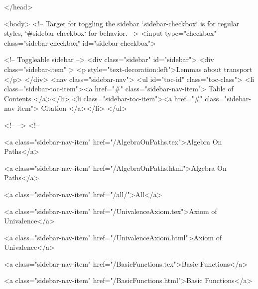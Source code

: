  
</head>




  <body>
    <!-- Target for toggling the sidebar `.sidebar-checkbox` is for regular
     styles, `#sidebar-checkbox` for behavior. -->
<input type="checkbox" class="sidebar-checkbox" id="sidebar-checkbox">

<!-- Toggleable sidebar -->
<div class="sidebar" id="sidebar">
  <div class="sidebar-item" >
    <p style="text-decoration:left">Lemmas about transport </p>
  </div>
  <nav class="sidebar-nav">
    <ul id="toc-id" class="toc-class">
  <li class="sidebar-toc-item"><a href="#" class="sidebar-nav-item"> Table of Contents </a></li>
  <li class="sidebar-toc-item"><a href="#" class="sidebar-nav-item"> Citation </a></li>
</ul>


    <!--  -->
    <!-- 
      
    
      
    
      
    
      
        
      
    
      
        
          <a class="sidebar-nav-item" href="/AlgebraOnPaths.tex">Algebra On Paths</a>
        
      
    
      
        
          <a class="sidebar-nav-item" href="/AlgebraOnPaths.html">Algebra On Paths</a>
        
      
    
      
        
          <a class="sidebar-nav-item" href="/all/">All</a>
        
      
    
      
        
          <a class="sidebar-nav-item" href="/UnivalenceAxiom.tex">Axiom of Univalence</a>
        
      
    
      
        
          <a class="sidebar-nav-item" href="/UnivalenceAxiom.html">Axiom of Univalence</a>
        
      
    
      
        
          <a class="sidebar-nav-item" href="/BasicFunctions.tex">Basic Functions</a>
        
      
    
      
        
          <a class="sidebar-nav-item" href="/BasicFunctions.html">Basic Functions</a>
        
